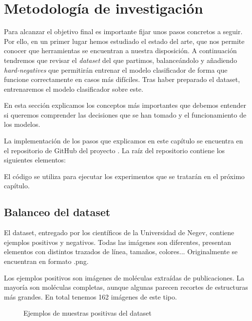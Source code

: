 \chapter{Metodología de investigación}
Para alcanzar el objetivo final es importante fijar unos pasos concretos a seguir. Por ello, en un primer lugar hemos estudiado el estado del arte, que nos permite conocer que herramientas se encuentran a nuestra disposición. A continuación tendremos que revisar el \textit{dataset} del que partimos, balanceándolo y añadiendo \textit{hard-negatives} que permitirán entrenar el modelo clasificador de forma que funcione correctamente en casos más difíciles. Tras haber preparado el dataset, entrenaremos el modelo clasificador sobre este.

En esta sección explicamos los conceptos más importantes que debemos entender si queremos comprender las decisiones que se han tomado y el funcionamiento de los modelos.

La implementación de los pasos que explicamos en este capítulo se encuentra en el repositorio de GitHub del proyecto \cite{repository}. La raíz del repositorio contiene los siguientes elementos:


El código se utiliza para ejecutar los experimentos que se tratarán en el próximo capítulo.

\newpage
\section{Balanceo del dataset}
El dataset, entregado por los científicos de la Universidad de Negev, contiene ejemplos positivos y negativos. Todas las imágenes son diferentes, presentan elementos con distintos trazados de línea, tamaños, colores... Originalmente se encuentran en formato .png.

Los ejemplos positivos son imágenes de moléculas extraídas de publicaciones. La mayoría son moléculas completas, aunque algunas parecen recortes de estructuras más grandes. En total tenemos 162 imágenes de este tipo.

\begin{figure}[H]
\centering
    \caption{Ejemplos de muestras positivas del dataset} 
\end{figure}

